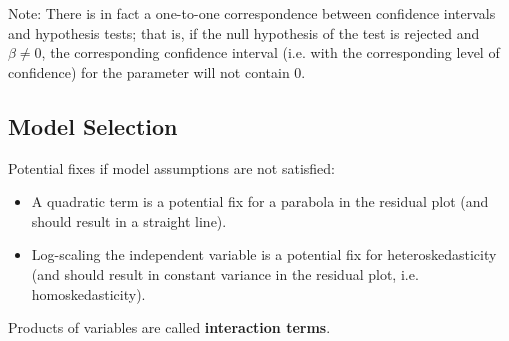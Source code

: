 Note: There is in fact a one-to-one correspondence between confidence intervals and hypothesis tests; that is, if the null hypothesis of the test is rejected and $\beta \neq 0$, the corresponding confidence interval (i.e. with the corresponding level of confidence) for the parameter will not contain $0$.

\subsection{Model Selection}

\begin{paracol}{2}

	Potential fixes if model assumptions are not satisfied:

	\begin{itemize}
		\item A quadratic term is a potential fix for a parabola in the residual plot (and should result in a straight line).
		\item Log-scaling the independent variable is a potential fix for heteroskedasticity (and should result in constant variance in the residual plot, i.e. homoskedasticity).
	\end{itemize}

	\quad

	Products of variables are called \textbf{interaction terms}.

	\switchcolumn


\end{paracol}
